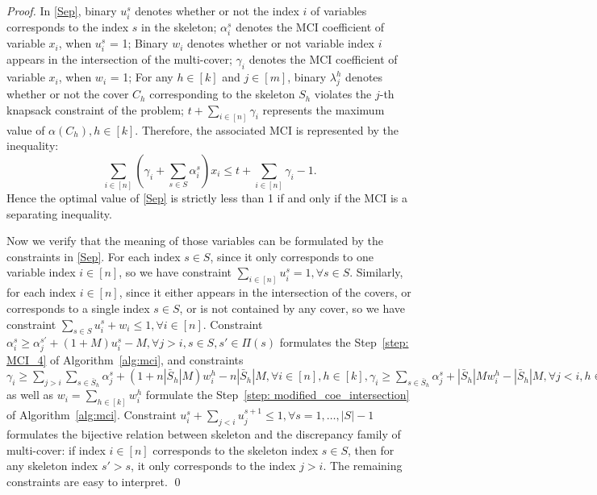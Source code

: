 \begin{appendices}
\begin{proof}
In \eqref{Sep}, binary $u^s_i$ denotes whether or not the index $i$ of variables corresponds to the index $s$ in the skeleton; $\alpha^s_i$ denotes the MCI coefficient of variable $x_i$, when $u^s_i$ = 1; Binary $w_i$ denotes whether or not variable index $i$ appears in the intersection of the multi-cover; $\gamma_i$ denotes the MCI coefficient of variable $x_i$, when $w_i$ = 1; For any $h \in [k]$ and $j \in [m]$, binary $\lambda^h_j$ denotes whether or not the cover $C_h$ corresponding to the skeleton $S_h$ violates the $j$-th knapsack constraint of the problem; $ t + \sum_{i \in [n]} \gamma_i $ represents the maximum value of $\alpha(C_h), h \in [k]$. 
Therefore, the associated MCI is represented by the inequality:
$$
 \sum_{i \in [n]} (\gamma_i + \sum_{s \in S} \alpha^s_i) x_i \leq t + \sum_{i \in [n]} \gamma_i - 1.
$$
Hence the optimal value of \eqref{Sep} is strictly less than 1 if and only if the MCI is a separating inequality. 

Now we verify that the meaning of those variables can be formulated by the constraints in \eqref{Sep}. 
For each index $s \in S$, since it only corresponds to one variable index $i \in [n]$, so we have constraint $\sum_{i \in [n]} u^s_i = 1, \forall s \in S$. Similarly, for each index $i \in [n]$, since it either appears in the intersection of the covers, or corresponds to a single index $s \in S$, or is not contained by any cover, so we have constraint $ \sum_{s \in S} u^s_i + w_i \leq 1, \forall i \in [n]$. Constraint $\alpha^s_i \geq \alpha^{s'}_j + (1+M) u^s_i -M, \forall j > i, s \in S, s' \in \Pi(s)$ formulates the Step~\ref{step: MCI_4} of Algorithm~\ref{alg:mci}, and constraints $\gamma_i \geq \sum_{j>i} \sum_{s \in \bar S_h} \alpha^s_j + (1+n |\bar S_h| M)w^h_i - n|\bar S_h| M, \forall i \in [n], h \in [k],  \gamma_i \geq \sum_{s \in \bar S_h} \alpha^s_j + |\bar S_h| M w^h_i -  |\bar S_h| M, \forall j < i, h \in [k]$ as well as $w_i = \sum_{h \in [k]} w^h_i$ formulate the Step~\ref{step: modified_coe_intersection} of Algorithm~\ref{alg:mci}. Constraint $u^s_i + \sum_{j<i} u^{s+1}_j \leq 1, \forall s = 1, \ldots, |S| - 1$ formulates the bijective relation between skeleton and the discrepancy family of multi-cover: if index $i \in [n]$ corresponds to the skeleton index $s \in S$, then for any skeleton index $s' > s$, it only corresponds to the index $j > i$. The remaining constraints are easy to interpret. 
\qed \end{proof}



\end{appendices}
